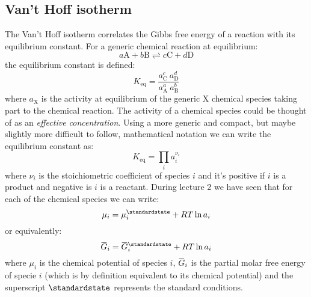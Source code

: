 \documentclass[12pt,a4paper]{report}
\newcommand{\overbar}[1]{\mkern 1.5mu\overline{\mkern-1.5mu#1\mkern-1.5mu}\mkern 1.5mu}
\begin{document}
   \subsection*{Van't Hoff isotherm}
   The Van't Hoff isotherm correlates the Gibbs free energy of a reaction with its equilibrium constant.
   For a generic chemical reaction at equilibrium:
   \begin{equation*}
   a\mathrm{A}+b\mathrm{B} \rightleftharpoons c\mathrm{C}+d\mathrm{D}
   \end{equation*}
   the equilibrium constant is defined:
   \begin{equation*}
   K_{\mathrm{eq}}=\frac{a_{\mathrm{C}}^{c}\ a_{\mathrm{D}}^{d}}{a_{\mathrm{A}}^{a}\  a_{\mathrm{B}}^{b}}
   \end{equation*}
   where $a_{\mathrm{X}}$ is the activity at equilibrium of the generic X chemical species taking part to the chemical reaction. The activity of a chemical species could be thought of as an \textit{effective concentration}. Using a more generic and compact, but maybe slightly more difficult to follow, mathematical notation we can write the equilibrium constant as:
   \begin{equation*}
   K_{\mathrm{eq}}=\prod\limits_{i} a_{i}^{\nu_{i}}
   \end{equation*}
   where $\nu_{i}$ is the stoichiometric coefficient of species $i$ and it's positive if $i$ is a product and negative is $i$ is a reactant.
   During lecture 2 we have seen that for each of the chemical species we can write:
   \begin{equation*}
   \mu_{i}=\mu_{i}^{\standardstate}+RT \ln a_{i}
   \end{equation*}
   or equivalently:
   \begin{equation*}
   \overbar{G}_{i}=\overbar{G}_{i}^{\standardstate}+RT \ln a_{i}
   \end{equation*}
   where $\mu_{i}$ is the chemical potential of species $i$, $\overbar{G}_{i}$ is the partial molar free energy of specie $i$ (which is by definition equivalent to its chemical potential) and the superscript $\standardstate$ represents the standard conditions.
   
\end{document}
